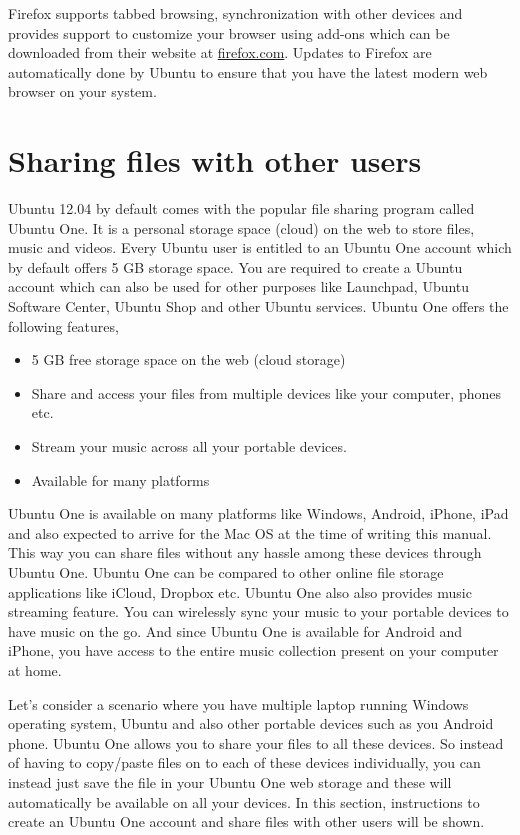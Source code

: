 \par \noindent Firefox supports tabbed browsing, synchronization with other devices and provides support to customize your browser using add-ons which can be downloaded from their website at \href{www.firefox.com}{firefox.com}. Updates to Firefox are automatically done by Ubuntu to ensure that you have the latest modern web browser on your system.

\newpage
\section{Sharing files with other users}   
Ubuntu 12.04 by default comes with the popular file sharing program called Ubuntu One. It is a personal storage space (cloud) on the web to store files, music and videos. Every Ubuntu user is entitled to an Ubuntu One account which by default offers 5 GB storage space. You are required to create a Ubuntu account which can also be used for other purposes like Launchpad, Ubuntu Software Center, Ubuntu Shop and other Ubuntu services. Ubuntu One offers the following features,

\begin{itemize}
	\item 5 GB free storage space on the web (cloud storage)
	\item Share and access your files from multiple devices like your computer, phones etc.
	\item Stream your music across all your portable devices.
	\item Available for many platforms
\end{itemize}

\par \noindent Ubuntu One is available on many platforms like Windows, Android, iPhone, iPad and also expected to arrive for the Mac OS at the time of writing this manual. This way you can share files without any hassle among these devices through Ubuntu One. Ubuntu One can be compared to other online file storage applications like iCloud, Dropbox etc. Ubuntu One also also provides music streaming feature. You can wirelessly sync your music to your portable devices to have music on the go. And since Ubuntu One is available for Android and iPhone, you have access to the entire music collection present on your computer at home.\\

\par \noindent Let's consider a scenario where you have multiple laptop running Windows operating system, Ubuntu and also other portable devices such as you Android phone. Ubuntu One allows you to share your files to all these devices. So instead of having to copy/paste files on to each of these devices individually, you can instead just save the file in your Ubuntu One web storage and these will automatically be available on all your devices. In this section, instructions to create an Ubuntu One account and share files with other users will be shown. 

